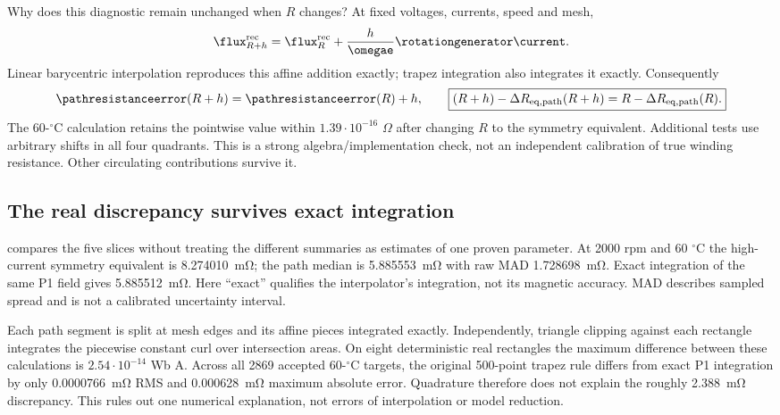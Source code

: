Why does this diagnostic remain unchanged when $R$ changes? At fixed
voltages, currents, speed and mesh,
\begin{equation}
 \flux_{R+h}^{\rm rec}=\flux_R^{\rm rec}
                  +\frac{h}{\omegae}\rotationgenerator\current.
\end{equation}
Linear barycentric interpolation reproduces this affine addition exactly;
trapez integration also integrates it exactly. Consequently
\begin{equation}
 \pathresistanceerror(R+h)=\pathresistanceerror(R)+h,
 \qquad
 \boxed{(R+h)-\Delta R_{\rm eq,path}(R+h)
              =R-\Delta R_{\rm eq,path}(R).}\label{eq:path-invariance}
\end{equation}
The 60-$^\circ$C calculation retains the pointwise value within
$1.39\cdot10^{-16}$ $\Omega$ after changing $R$ to the symmetry equivalent.
Additional tests use arbitrary shifts in all four quadrants.
This is a strong algebra/implementation check, not an independent calibration
of true winding resistance. Other circulating contributions survive it.

\subsection{The real discrepancy survives exact integration}
 compares the five slices without treating the
different summaries as estimates of one proven parameter. At 2000 rpm and
60 $^\circ$C the high-current symmetry equivalent is
\SI{8.274010}{\milli\ohm}; the path median is
\SI{5.885553}{\milli\ohm} with raw MAD
\SI{1.728698}{\milli\ohm}. Exact integration of the same P1 field gives
\SI{5.885512}{\milli\ohm}. Here ``exact'' qualifies the interpolator's
integration, not its magnetic accuracy. MAD describes sampled spread and
is not a calibrated uncertainty interval.
\begin{table}[tb]
\centering\small

\caption{Conditional symmetry equivalent, median path equivalent, its raw
MAD, and exact-P1 path median from existing audit JSON. All resistance
columns are m$\Omega$; $n$ is rpm and rotor reference is $^\circ$C.
The symmetry summary uses high pairs; path statistics use all accepted
rectangles. Six decimal places document reproducibility, not accuracy.}
\label{tab:audit-equivalents}
\end{table}

Each path segment is split at mesh edges and its affine pieces integrated
exactly. Independently, triangle clipping against each rectangle integrates
the piecewise constant curl over intersection areas. On eight deterministic
real rectangles the maximum difference between these calculations is
$2.54\cdot10^{-14}$ Wb A. Across all 2869 accepted 60-$^\circ$C targets,
the original 500-point trapez rule differs from exact P1 integration by only
\SI{0.0000766}{\milli\ohm} RMS and
\SI{0.000628}{\milli\ohm} maximum absolute error. Quadrature therefore does
not explain the roughly \SI{2.388}{\milli\ohm} discrepancy. This rules out
one numerical explanation, not errors of interpolation or model reduction.

